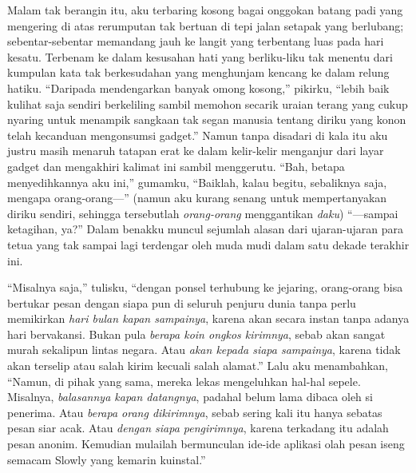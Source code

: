 \documentclass[smalldemyvopaper,11pt,twoside,onecolumn,openright,extrafontsizes]{memoir}
\begin{document}
Malam tak berangin itu, aku terbaring kosong bagai onggokan batang padi yang mengering di atas rerumputan tak bertuan di tepi jalan setapak yang berlubang; sebentar-sebentar memandang jauh ke langit yang terbentang luas pada hari kesatu. Terbenam ke dalam kesusahan hati yang berliku-liku tak menentu dari kumpulan kata tak berkesudahan yang menghunjam kencang ke dalam relung hatiku. ``Daripada mendengarkan banyak omong kosong,'' pikirku, ``lebih baik kulihat saja sendiri berkeliling sambil memohon secarik uraian terang yang cukup nyaring untuk menampik sangkaan tak segan manusia tentang diriku yang konon telah kecanduan mengonsumsi gadget.'' Namun tanpa disadari di kala itu aku justru masih menaruh tatapan erat ke dalam kelir-kelir menganjur dari layar gadget dan mengakhiri kalimat ini sambil menggerutu. ``Bah, betapa menyedihkannya aku ini,'' gumamku, ``Baiklah, kalau begitu, sebaliknya saja, mengapa orang-orang---'' (namun aku kurang senang untuk mempertanyakan diriku sendiri, sehingga tersebutlah \textit{orang-orang} menggantikan \textit{daku}) ``---sampai ketagihan, ya?'' Dalam benakku muncul sejumlah alasan dari ujaran-ujaran para tetua yang tak sampai lagi terdengar oleh muda mudi dalam satu dekade terakhir ini.


``Misalnya saja,'' tulisku, ``dengan ponsel terhubung ke jejaring, orang-orang bisa bertukar pesan dengan siapa pun di seluruh penjuru dunia tanpa perlu memikirkan \textit{hari bulan kapan sampainya}, karena akan secara instan tanpa adanya hari bervakansi. Bukan pula \textit{berapa koin ongkos kirimnya}, sebab akan sangat murah sekalipun lintas negara. Atau \textit{akan kepada siapa sampainya}, karena tidak akan terselip atau salah kirim kecuali salah alamat.'' Lalu aku menambahkan, ``Namun, di pihak yang sama, mereka lekas mengeluhkan hal-hal sepele. Misalnya, \textit{balasannya kapan datangnya}, padahal belum lama dibaca oleh si penerima. Atau \textit{berapa orang dikirimnya}, sebab sering kali itu hanya sebatas pesan siar acak. Atau \textit{dengan siapa pengirimnya}, karena terkadang itu adalah pesan anonim. Kemudian mulailah bermunculan ide-ide aplikasi olah pesan iseng semacam Slowly yang kemarin kuinstal.''

\end{document}
